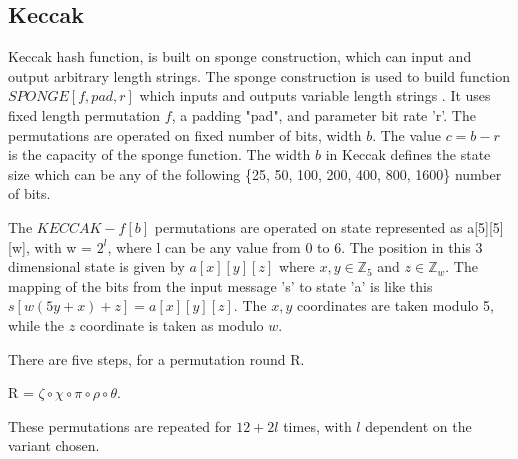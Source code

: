 \documentclass[12pt]{artikel3}                  %
\begin{document}
\subsection{Keccak}
Keccak hash function, is built on sponge construction, which can input and output arbitrary length strings. The sponge 
construction is used to build function $SPONGE[f, pad, r]$ which inputs and outputs variable length strings \cite{00016}. 
It uses fixed length permutation $f$, a padding "pad", and parameter bit rate 'r'. The permutations are operated on
fixed number of bits, width $b$. The value $c = b - r$ is the capacity of the sponge function. The width $b$ in Keccak
defines the state size which can be any of the following \{25, 50, 100, 200, 400, 800, 1600\} number of bits.

The $KECCAK-f[b]$ permutations are operated on state represented as a[5][5][w], with w = $2^{l}$, where l can be any value
from 0 to 6. The position in this 3 dimensional state is given by $a[x][y][z]$ where $x, y \in \mathbb{Z}_{5}$ and $z \in 
\mathbb{Z}_{w}$. The mapping of the bits from the input message 's' to state 'a' is like this $s[w (5y + x) + z] = a[x][y][z]$.
The $x, y$ coordinates are taken modulo 5, while the $z$ coordinate is taken as modulo $w$.  \cite{00015}

There are five steps, for a permutation round R.
\begin{center}R = $\zeta \circ \chi \circ \pi \circ \rho \circ \theta$. \end{center} 
These permutations are repeated for $12 + 2l$ times, with $l$ dependent on the variant chosen.
\end{document}
